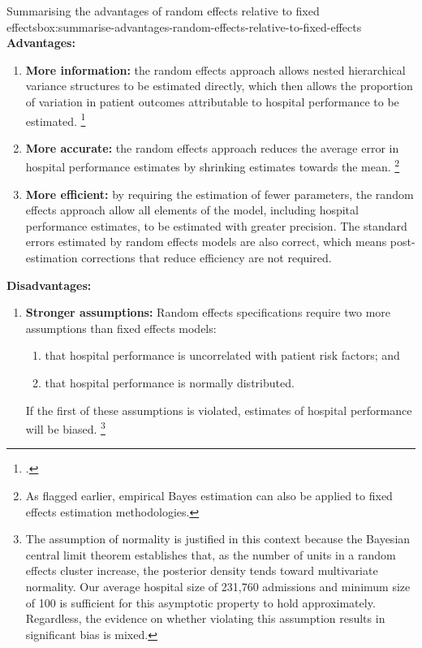 \documentclass[submission]{grattan}
\begin{document}
\begin{bigbox*}{Summarising the advantages of random effects relative to fixed effects}{box:summarise-advantages-random-effects-relative-to-fixed-effects}
\textbf{Advantages:}
\begin{enumerate}
\item \textbf{More information:} the random effects approach allows nested hierarchical variance structures to be estimated directly, which then allows the proportion of variation in patient outcomes attributable to hospital performance to be estimated.
	\footcite{Ash-etal-2012-Stats-issues-assessing-hospital-perf}

\item \textbf{More accurate:} the random effects approach reduces the average error in hospital performance estimates by shrinking estimates towards the mean.%
\footnote{As flagged earlier, empirical Bayes estimation can also be applied to fixed effects estimation methodologies.}

\item \textbf{More efficient:} by requiring the estimation of fewer parameters, the random effects approach allow all elements of the model, including hospital performance estimates, to be estimated with greater precision.
The standard errors estimated by random effects models are also correct, which means post-estimation corrections that reduce efficiency are not required.
\end{enumerate}

\eject
\textbf{Disadvantages:}
\begin{enumerate}
\item \textbf{Stronger assumptions:} Random effects specifications require two more assumptions than fixed effects models:
\begin{enumerate}
\item that hospital performance is uncorrelated with patient risk factors; and
\item that hospital performance is normally distributed.
\end{enumerate}
If the first of these assumptions is violated, estimates of hospital performance will be biased.%
\footnote{The assumption of normality is justified in this context because the Bayesian central limit theorem establishes that, as the number of units in a random effects cluster increase, the posterior density tends toward multivariate normality.
Our average hospital size of 231,760 admissions and minimum size of 100 is sufficient for this asymptotic property to hold approximately.
Regardless, the evidence on whether violating this assumption results in significant bias is mixed.}


\end{enumerate}
\end{bigbox*}
\end{document}
